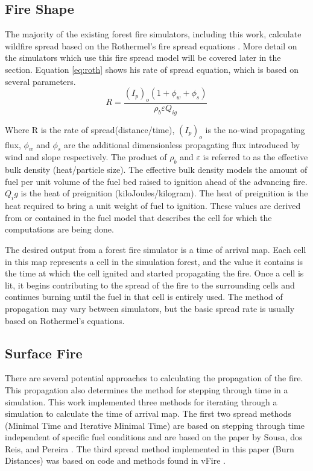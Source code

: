 \subsection{Fire Shape}
The majority of the existing forest fire simulators, including this work, calculate wildfire spread based on the Rothermel's fire spread equations \cite{roth}. More detail on the simulators which use this fire spread model will be covered later in the section. Equation \ref{eq:roth} shows his rate of spread equation, which is based on several parameters. 
\begin{equation} \label{eq:roth}
R = \frac{(I_{p})_{o}(1 + \phi_{w} + \phi_{s})}{\rho_{b}\varepsilon Q_{ig}}
\end{equation}

Where R is the rate of spread(distance/time), $(I_p)_o$ is the no-wind propagating flux, $\phi_w$ and $\phi_s$ are the additional dimensionless propagating flux introduced by wind and slope respectively. The product of $\rho_b$ and $\varepsilon$ is referred to as the effective bulk density (heat/particle size). The effective bulk density models the amount of fuel per unit volume of the fuel bed raised to ignition ahead of the advancing fire. $Q_ig$ is the heat of preignition (kiloJoules/kilogram). The heat of preignition is the heat required to bring a unit weight of fuel to ignition. These values are derived from or contained in the fuel model that describes the cell for which the computations are being done. 

The desired output from a forest fire simulator is a time of arrival map. Each cell in this map represents a cell in the simulation forest, and the value it contains is the time at which the cell ignited and started propagating the fire. Once a cell is lit, it begins contributing to the spread of the fire to the surrounding cells and continues burning until the fuel in that cell is entirely used. The method of propagation may vary between simulators, but the basic spread rate is usually based on Rothermel's equations.

\subsection{Surface Fire}
There are several potential approaches to calculating the propagation of the fire. This propagation also determines the method for stepping through time in a simulation. This work implemented three methods for iterating through a simulation to calculate the time of arrival map. The first two spread methods (Minimal Time and Iterative Minimal Time) are based on stepping through time independent of specific fuel conditions and are based on the paper by Sousa, dos Reis, and Pereira \cite{gpufire}. The third spread method implemented in this paper (Burn Distances) was based on code and methods found in vFire \cite{vFire}. 

